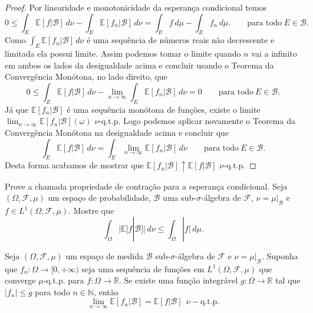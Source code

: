 \begin{proof}
Por linearidade e monotonicidade da esperança condicional temos 
\[
0\leq \int_{E} \mathbb{E}[f|\mathcal{B}]\, d\nu 
- 
\int_{E} \mathbb{E}[f_n|\mathcal{B}]\, d\nu
=\int_{E} f\, d\mu - \int_{E} f_n\, d\mu.
\qquad \text{para todo}\ E\in\mathcal{B}.
\]
Como $\int_{E} \mathbb{E}[f_n|\mathcal{B}]\, d\nu$ 
é uma sequência de números reais não decrescente e 
limitada ela possui limite. 
Assim podemos tomar o limite quando $n$ vai a infinito 
em ambos os lados da desigualdade acima e concluir 
usando o Teorema da Convergência Monótona, 
no lado direito,  que
\[
0
\leq 
\int_{E} \mathbb{E}[f|\mathcal{B}]\, d\nu 
- 
\lim_{n\to\infty}\int_{E} \mathbb{E}[f_n|\mathcal{B}]\, d\nu
=0
\qquad \text{para todo}\ E\in\mathcal{B}.
\]
Já que $\mathbb{E}[f_n|\mathcal{B}]$ é uma sequência
monótona de funções, existe o limite 
$\lim_{n\to\infty}\mathbb{E}[f_n|\mathcal{B}](\omega)$ 
$\nu$-q.t.p.
Logo podemos aplicar novamente o 
Teorema da Convergência Monótona
na desigualdade acima e concluir que 
\[
\int_{E} \mathbb{E}[f|\mathcal{B}]\, d\nu 
= 
\int_{E} \lim_{n\to\infty}\mathbb{E}[f_n|\mathcal{B}]\, d\nu
\qquad \text{para todo}\ E\in\mathcal{B}.
\]
Desta forma acabamos de mostrar que 
$\mathbb{E}[f_n|\mathcal{B}]\uparrow \mathbb{E}[f|\mathcal{B}]$ 
$\nu$-q.t.p.
\end{proof}



\begin{exercicio} 
Prove a chamada propriedade de contração 
para a esperança condicional. 
Seja $(\Omega,\mathcal{F},\mu)$ um espaço 
de probabilidade, $\mathcal{B}$ uma 
sub-$\sigma$-álgebra de $\mathcal{F}$, 
$\nu=\mu|_{\mathcal{B}}$ e 
$f\in L^1(\Omega,\mathcal{F},\mu)$. 
Mostre que
\[
\int_{\Omega} \big|\mathbb{E}[f|\mathcal{B}]\big|\, d\nu 
\leq 
\int_{\Omega} |f|\, d\mu.
\]
\end{exercicio}



\begin{teorema} 
Seja $(\Omega,\mathcal{F},\mu)$ um espaço de 
medida $\mathcal{B}$ sub-$\sigma$-álgebra 
de $\mathcal{F}$ e $\nu=\mu|_{\mathcal{B}}$. 
Suponha que $f_n:\Omega\to [0,+\infty)$ 
seja uma sequência de funções 
em $L^1(\Omega,\mathcal{F},\mu)$ que converge 
$\mu$-q.t.p. para $f:\Omega\to\mathbb{R}$.
Se existe uma função integrável 
$g:\Omega\to\mathbb{R}$ tal que $|f_n|\leq g$ 
para todo $n\in\mathbb{N}$, então 
\[
\lim_{n\to\infty} \mathbb{E}[f_n|\mathcal{B}]
=
\mathbb{E}[f|\mathcal{B}] \ \ 
\nu-\text{q.t.p.}
\]
\end{teorema}



